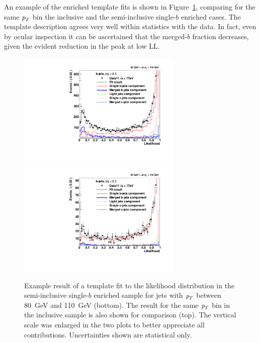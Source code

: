An example of the enriched template fits is shown in Figure~\ref{fig:fitenriched2btag1}, comparing for the same ${\emph{p}_{T}}$ bin the inclusive and the semi-inclusive single-$b$ enriched cases.  %
The template description agrees very well within statistics with the data. In fact, even by ocular inspection it can be ascertained that the merged-$b$ fraction decreases, given the evident reduction in the peak at low LL. 
\begin{figure}[tp]
\centering
\includegraphics[width=0.7\textwidth]{FIGS/Fits/LikelihoodFit_3param_ETAFull_ZOOM_Bin2.pdf}
\includegraphics[width=0.7\textwidth]{FIGS/Fits/LikelihoodFit_3param_ETAFull_DataEnriched2btagZOOMtest_Bin2.pdf}
\caption{Example result of a template fit to the likelihood distribution in the semi-inclusive single-$b$ enriched sample for jets with ${\emph{p}_{T}}$ between  80~GeV and 110~GeV (bottom).  The result for the same  ${\emph{p}_{T}}$ bin in the inclusive sample is also shown for comparison (top).  The vertical scale was enlarged in the two plots to better appreciate all contributions. Uncertainties shown are statistical only.}
\label{fig:fitenriched2btag1}
\end{figure}

